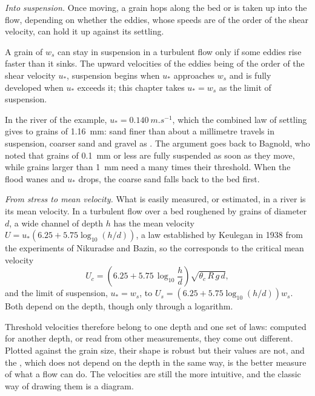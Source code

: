\emph{Into suspension.} Once moving, a grain hops along the bed or is taken up
into the flow, depending on whether the eddies, whose speeds are of the order
of the shear velocity, can hold it up against its settling.

\begin{proposition}\label{prop:b1:erosion-transport:suspension}
A grain of  $w_s$ can stay in suspension in a turbulent flow
only if some eddies rise faster than it sinks. The upward velocities of the
eddies being of the order of the shear velocity $u_*$, suspension begins when
$u_*$ approaches $w_s$ and is fully developed when $u_*$ exceeds it; this
chapter takes $u_* = w_s$ as the limit of suspension.
\end{proposition}
\admitted

In the river of the example, $u_* = \qty{0.140}{m.s^{-1}}$, which the combined
law of settling gives to grains of \qty{1.16}{mm}: sand finer than about a
millimetre travels in suspension, coarser sand and gravel as . The
argument goes back to Bagnold, who noted that grains of \qty{0.1}{mm} or
less are fully suspended as soon as they move, while grains larger than
\qty{1}{mm} need a  many times their threshold. When
the flood wanes and $u_*$ drops, the coarse sand falls back to the bed first.

\emph{From stress to mean velocity.} What is easily measured, or estimated, in
a river is its mean velocity. In a turbulent flow over a bed roughened by
grains of diameter $d$, a wide channel of depth $h$ has the mean velocity
$U = u_*\left(6.25 + 5.75\log_{10}(h/d)\right)$, a law established by Keulegan
in 1938 from the experiments of Nikuradse and Bazin, so the 
corresponds to the critical mean velocity
\[
  U_c = \left(6.25 + 5.75\,\log_{10}\frac{h}{d}\right)\sqrt{\theta_c\,R\,g\,d},
\]
and the limit of suspension, $u_* = w_s$, to $U_s = \left(6.25 +
5.75\log_{10}(h/d)\right) w_s$. Both depend on the depth, though only through a
logarithm.

Threshold velocities therefore belong to one depth and one set of laws:
computed for another depth, or read from other measurements, they come out
different. Plotted against the grain size, their shape is robust but their
values are not, and the , which does not depend on the depth in
the same way, is the better measure of what a flow can do. The velocities are
still the more intuitive, and the classic way of drawing them is a diagram.

